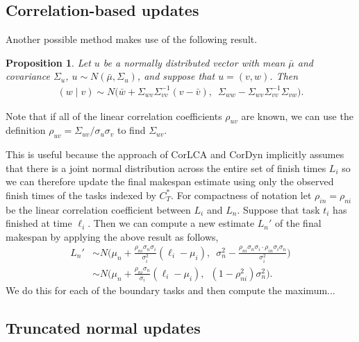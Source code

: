 \documentclass[12pt]{article}
\newtheorem{prop}[theorem]{Proposition}
\begin{document}
\subsection{Correlation-based updates}
\label{subsect.corr_update}

Another possible method makes use of the following result.
\begin{prop}
	Let $u$ be a normally distributed vector with mean $\bar{\mu}$ and covariance $\Sigma_u$, $u \sim N(\bar{\mu}, \Sigma_u)$, and suppose that $u = (v, w)$. Then 
	\begin{align*}
	(w \mid v) \sim N \big( \bar{w} + \Sigma_{wv}\Sigma_{vv}^{-1} (v - \bar{v}), \enspace  \Sigma_{ww} - \Sigma_{wv} \Sigma_{vv}^{-1} \Sigma_{vw} \big).
	\end{align*}
\end{prop}
Note that if all of the linear correlation coefficients $\rho_{uv}$ are known, we can use the definition $\rho_{uv} = \Sigma_{uv} / \sigma_u \sigma_v$ to find $\Sigma_{uv}$.

This is useful because the approach of CorLCA and CorDyn implicitly assumes that there is a joint normal distribution across the entire set of finish times $L_i$ so we can therefore update the final makespan estimate using only the observed finish times of the tasks indexed by $C_T^*$. For compactness of notation let $\rho_{in} = \rho_{ni}$ be the linear correlation coefficient between $L_i$ and $L_n$. Suppose that task $t_i$ has finished at time $\ell_i$. Then we can compute a new estimate $L_n'$ of the final makespan by applying the above result as follows,
\begin{align*}
L_n' &\sim N \bigg( \mu_{n} + \frac{\rho_{ni} \sigma_{n} \sigma_{i}}{\sigma_{i}^2} (\ell_i - \mu_{i}), \enspace \sigma_{n}^2 - \frac{\rho_{ni} \sigma_{n} \sigma_{i} \cdot \rho_{in} \sigma_{i} \sigma_{n}}{\sigma_{i}^2} \bigg) \nonumber\\
&\sim N \bigg(\mu_{n} + \frac{\rho_{ni} \sigma_{n}}{\sigma_{i}} (\ell_i - \mu_{i}), \enspace (1 - \rho_{ni}^2) \sigma_{n}^2 \bigg).
\end{align*}
We do this for each of the boundary tasks and then compute the maximum...


\subsection{Truncated normal updates}
\label{subsect.truncated_updates}
\end{document}

